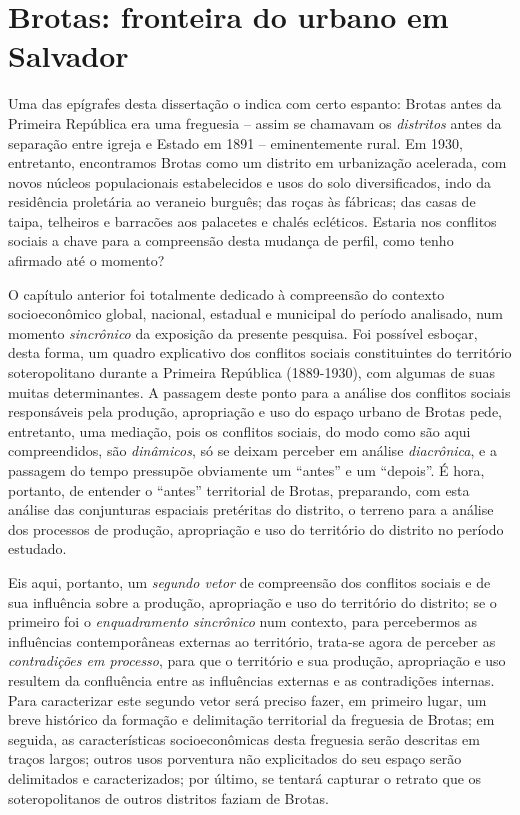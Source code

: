 \chapter{Brotas: fronteira do urbano em Salvador}\label{cap:2}

Uma das epígrafes desta dissertação o indica com certo espanto: Brotas antes da Primeira República era uma freguesia -- assim se chamavam os \textit{distritos} antes da separação entre igreja e Estado em 1891 -- eminentemente rural. Em 1930, entretanto, encontramos Brotas como um distrito em urbanização acelerada, com novos núcleos populacionais estabelecidos e usos do solo diversificados, indo da residência proletária ao veraneio burguês; das roças às fábricas; das casas de taipa, telheiros e barracões aos palacetes e chalés ecléticos. Estaria nos conflitos sociais a chave para a compreensão desta mudança de perfil, como tenho afirmado até o momento?

O capítulo anterior foi totalmente dedicado à compreensão do contexto socioeconômico global, nacional, estadual e municipal do período analisado, num momento \textit{sincrônico} da exposição da presente pesquisa. Foi possível esboçar, desta forma, um quadro explicativo dos conflitos sociais constituintes do território soteropolitano durante a Primeira República (1889-1930), com algumas de suas muitas determinantes. A passagem deste ponto para a análise dos conflitos sociais responsáveis pela produção, apropriação e uso do espaço urbano de Brotas pede, entretanto, uma mediação, pois os conflitos sociais, do modo como são aqui compreendidos, são \textit{dinâmicos}, só se deixam perceber em análise \textit{diacrônica}, e a passagem do tempo pressupõe obviamente um ``antes'' e um ``depois''. É hora, portanto, de entender o ``antes'' territorial de Brotas, preparando, com esta análise das conjunturas espaciais pretéritas do distrito, o terreno para a análise dos processos de produção, apropriação e uso do território do distrito no período estudado. 

Eis aqui, portanto, um \textit{segundo vetor} de compreensão dos conflitos sociais e de sua influência sobre a produção, apropriação e uso do território do distrito; se o primeiro foi o \textit{enquadramento sincrônico} num contexto, para percebermos as influências contemporâneas externas ao território, trata-se agora de perceber as \textit{contradições em processo}, para que o território e sua produção, apropriação e uso resultem da confluência entre as influências externas e as contradições internas. Para caracterizar este segundo vetor será preciso fazer, em primeiro lugar, um breve histórico da formação e delimitação territorial da freguesia de Brotas; em seguida, as características socioeconômicas desta freguesia serão descritas em traços largos; outros usos porventura não explicitados do seu espaço serão delimitados e caracterizados; por último, se tentará capturar o retrato que os soteropolitanos de outros distritos faziam de Brotas. 

